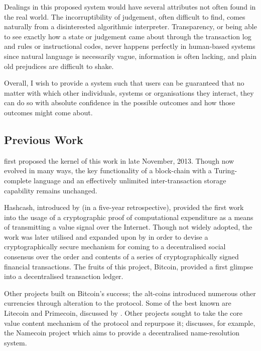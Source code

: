 \documentclass[UTF8,nofonts]{ctexart}
\begin{document}
\begin{multicols}{2}
Dealings in this proposed system would have several attributes not often found in the real world. The incorruptibility of judgement, often difficult to find, comes naturally from a disinterested algorithmic interpreter. Transparency, or being able to see exactly how a state or judgement came about through the transaction log and rules or instructional codes, never happens perfectly in human-based systems since natural language is necessarily vague, information is often lacking, and plain old prejudices are difficult to shake.

Overall, I wish to provide a system such that users can be guaranteed that no matter with which other individuals, systems or organisations they interact, they can do so with absolute confidence in the possible outcomes and how those outcomes might come about.

\subsection{Previous Work} \label{ch:previous}

\cite{buterin2013ethereum} first proposed the kernel of this work in late November, 2013. Though now evolved in many ways, the key functionality of a block-chain with a Turing-complete language and an effectively unlimited inter-transaction storage capability remains unchanged.

Hashcash, introduced by \cite{back2002hashcash} (in a five-year retrospective), provided the first work into the usage of a cryptographic proof of computational expenditure as a means of transmitting a value signal over the Internet. Though not widely adopted, the work was later utilised and expanded upon by \cite{nakamoto2008bitcoin} in order to devise a cryptographically secure mechanism for coming to a decentralised social consensus over the order and contents of a series of cryptographically signed financial transactions. The fruits of this project, Bitcoin, provided a first glimpse into a decentralised transaction ledger.

Other projects built on Bitcoin's success; the alt-coins introduced numerous other currencies through alteration to the protocol. Some of the best known are Litecoin and Primecoin, discussed by \cite{sprankel2013technical}. Other projects sought to take the core value content mechanism of the protocol and repurpose it; \cite{aron2012bitcoin} discusses, for example, the Namecoin project which aims to provide a decentralised name-resolution system.


\end{multicols}
\end{document}
